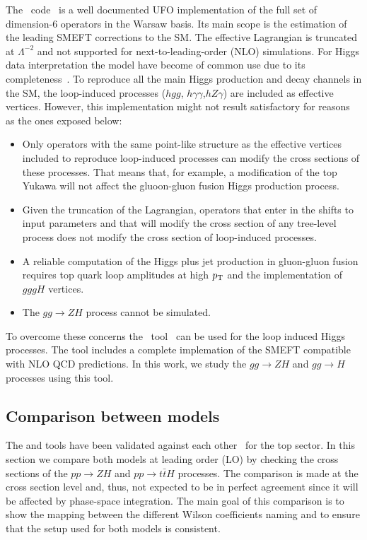 The \SMEFTsim\ code~\cite{Brivio:2017btx} is a well documented UFO implementation of the full set of dimension-6 operators in the Warsaw basis. Its main scope is the estimation of the leading SMEFT corrections to the SM. The effective Lagrangian is truncated at $\Lambda^{-2}$ and not supported for next-to-leading-order (NLO) simulations. For Higgs data interpretation the model have become of common use due to its completeness~\cite{Ellis:2018gqa,ATLAS:2019jst}.  To reproduce all the main Higgs production and decay channels in the SM, the loop-induced processes ($hgg$, $h\gamma\gamma$,$hZ\gamma$) are included as effective vertices. However, this implementation might not result satisfactory for reasons as the ones exposed below:
\begin{itemize}
\item Only operators with the same point-like structure as the effective vertices included to reproduce loop-induced processes can modify the cross sections of these processes. That means that, for example, a modification of the top Yukawa will not affect the gluoon-gluon fusion Higgs production process.
\item Given the truncation of the Lagrangian, operators that enter in the shifts to input parameters and that will modify the cross section of any tree-level process does not modify the cross section of loop-induced processes.
\item A reliable computation of the Higgs plus jet  production in gluon-gluon fusion requires top quark loop amplitudes at high $p_{\textrm T}$ and the implementation of $gggH$ vertices.
\item The $gg\to ZH$ process cannot be simulated.
\end{itemize}

To overcome these concerns the \SMEFTatNLO\ tool~\cite{SMEFTNLO} can be used for the loop induced Higgs processes. The tool includes a complete implemation of the SMEFT compatible with NLO QCD predictions. In this work, we study the $gg\to ZH$ and $gg\to H$ processes using this tool. 







\subsection{Comparison between models}
\label{sec:higgseft:section2}
The \SMEFTsim and \SMEFTatNLO tools have been validated against each other~\cite{Durieux:2019lnv} for the top sector. In this section we compare both models at leading order (LO) by checking the cross sections of the $pp\to ZH$ and $pp\to t\bar{t}H$ processes. The comparison is made at the cross section level and, thus, not expected to be in perfect agreement since it will be affected by phase-space integration. The main goal of this comparison is to show the mapping between the different Wilson coefficients naming and to ensure that the setup used for both models is consistent.

